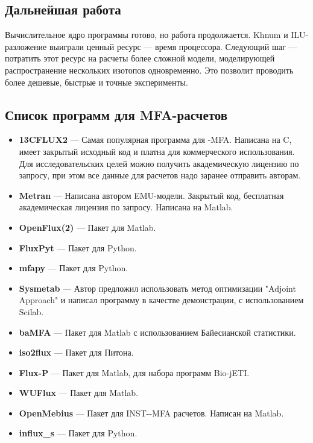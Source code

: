 \documentclass[14pt, a4paper]{extreport}
\newcommand{\CC}{C\nolinebreak\hspace{-.05em}\raisebox{.4ex}{\tiny\bf +}\nolinebreak\hspace{-.10em}\raisebox{.4ex}{\tiny\bf +}}
\def\CC{{C\nolinebreak[4]\hspace{-.05em}\raisebox{.4ex}{\tiny\bf ++}}} %
\begin{document}
\section{Дальнейшая работа}
Вычислительное ядро программы готово, но работа продолжается. Khnum и ILU-разложение выиграли ценный ресурс --- время процессора. Следующий шаг --- потратить этот ресурс на расчеты более сложной модели, моделирующей распространение нескольких изотопов одновременно. Это позволит проводить более дешевые, быстрые и точные эксперименты.


\begin{appendices}
	\chapter{Список программ для MFA-расчетов}
	\begin{itemize}
		\item \textbf{13CFLUX2} --- Самая популярная программа для -MFA. Написана на \CC{}, имеет закрытый исходный код и платна для коммерческого использования. Для исследовательских целей можно получить академическую лицензию по запросу\cite{13CFLUX2}, при этом все данные для расчетов надо заранее отправить авторам.
		
		\item \textbf{Metran} --- Написана автором EMU-модели. Закрытый код, бесплатная академическая лицензия по запросу. Написана на Matlab\cite{Metran}.
		
		\item \textbf{OpenFlux(2)} --- Пакет для Matlab\cite{OpenFlux, OpenFlux2}.
		
		\item \textbf{FluxPyt} --- Пакет для Python\cite{FluxPyt}.
		
		\item \textbf{mfapy} --- Пакет для Python.
		
		\item \textbf{Sysmetab} --- Автор предложил использовать метод оптимизации "Adjoint Approach"\cite{adjoint_approach} и написал программу в качестве демонстрации, с использованием Scilab.
		
		\item \textbf{baMFA} --- Пакет для Matlab с использованием Байесианской статистики\cite{bayesian_3}.
		
		\item \textbf{iso2flux} --- Пакет для Питона\cite{p13CMFA}.
		
		\item \textbf{Flux-P} --- Пакет для Matlab, для набора программ Bio-jETI\cite{Flux-P}.
		
		\item \textbf{WUFlux} --- Пакет для Matlab\cite{WUFlux}.
		
		\item \textbf{OpenMebius} --- Пакет для INST--MFA расчетов. Написан на Matlab\cite{OpenMebius}.
		
		\item \textbf{influx\_s} --- Пакет для Python\cite{influxs}.
	\end{itemize}
	
\end{appendices}
\end{document}
